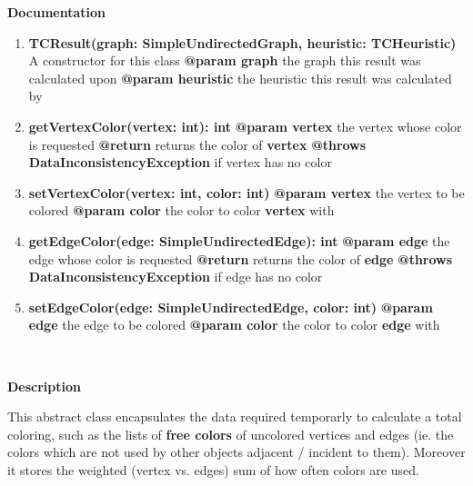 	\textbf{Documentation}
	\begin{enumerate}[+]
		\item{
			\textbf{TCResult(graph: SimpleUndirectedGraph, heuristic: TCHeuristic)} \newline
			A constructor for this class
			\textbf{@param graph} the graph this result was calculated upon \newline
			\textbf{@param heuristic} the heuristic this result was calculated by
		}
		\item{
			\textbf{getVertexColor(vertex: int): int} \newline
			\textbf{@param vertex} the vertex whose color is requested \newline
			\textbf{@return} returns the color of \textbf{vertex} \newline
			\textbf{@throws DataInconsistencyException} if vertex has no color
		}
		\item{
			\textbf{setVertexColor(vertex: int, color: int)} \newline
			\textbf{@param vertex} the vertex to be colored \newline
			\textbf{@param color} the color to color \textbf{vertex} with
		}
		\item{
			\textbf{getEdgeColor(edge: SimpleUndirectedEdge): int} \newline
			\textbf{@param edge} the edge whose color is requested \newline
			\textbf{@return} returns the color of \textbf{edge} \newline
			\textbf{@throws DataInconsistencyException} if edge has no color
		}
		\item{
			\textbf{setEdgeColor(edge: SimpleUndirectedEdge, color: int)} \newline
			\textbf{@param edge} the edge to be colored \newline
			\textbf{@param color} the color to color \textbf{edge} with
		}
	\end{enumerate}
	
	~\newline
	~\newline
	~\newline
	
	
	\textbf{Description}
	
	This abstract class encapsulates the data required temporarly to calculate a total coloring, such as the lists of \textbf{free colors} of uncolored vertices and edges (ie. the colors which are not used by other objects adjacent / incident to them). Moreover it stores the weighted (vertex vs. edges) sum of how often colors are used.
	
